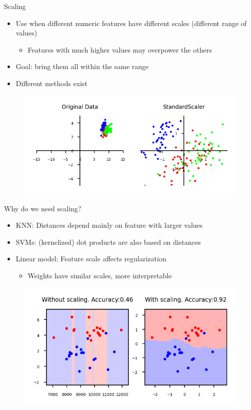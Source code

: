 \begin{frame}{Scaling}
    \begin{itemize}
        \item Use when different numeric features have different scales (different range of values)
        \begin{itemize}
            \item Features with much higher values may overpower the others
        \end{itemize}
        \item Goal: bring them all within the same range
        \item Different methods exist
    \end{itemize}

    \begin{figure}
        \centering
        \includegraphics[width=.8\textwidth,keepaspectratio]{images/pre-processing/scaling_1.png}
    \end{figure}
\end{frame}


\begin{frame}{Why do we need scaling?}
    \begin{itemize}
        \item KNN: Distances depend mainly on feature with larger values
        \item SVMs: (kernelized) dot products are also based on distances
        \item Linear model: Feature scale affects regularization
        \begin{itemize}
            \item Weights have similar scales, more interpretable
        \end{itemize}
    \end{itemize}

    \begin{figure}
        \centering
        \includegraphics[width=.8\textwidth,keepaspectratio]{images/pre-processing/scaling_2.png}
    \end{figure}
\end{frame}


